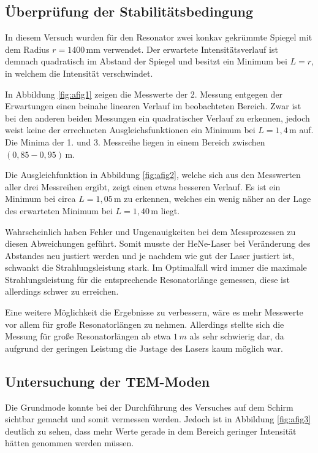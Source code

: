 \subsection*{Überprüfung der Stabilitätsbedingung}
In diesem Versuch wurden für den Resonator zwei konkav gekrümmte Spiegel mit dem Radius $r=1400\,\si{\mm}$ verwendet.
Der erwartete Intensitätsverlauf ist demnach quadratisch im Abstand der Spiegel und besitzt ein Minimum bei $L = r$, in welchem die Intensität verschwindet.

In Abbildung \ref{fig:afig1} zeigen die Messwerte der 2. Messung entgegen der Erwartungen einen beinahe linearen Verlauf im beobachteten Bereich. 
Zwar ist bei den anderen beiden Messungen ein quadratischer Verlauf zu erkennen, jedoch weist keine der errechneten Ausgleichsfunktionen ein Minimum bei $L = 1,4\,\si{\m}$ auf.
Die Minima der 1. und 3. Messreihe liegen in einem Bereich zwischen $(0,85-0,95)\,\si{\m}$.

Die Ausgleichfunktion in Abbildung \ref{fig:afig2}, welche sich aus den Messwerten aller drei Messreihen ergibt, zeigt einen etwas besseren Verlauf.
Es ist ein Minimum bei circa $L=1,05\,\si{\m}$ zu erkennen, welches ein wenig näher an der Lage des erwarteten Minimum bei $L=1,40\,\si{\m}$ liegt.

Wahrscheinlich haben Fehler und Ungenauigkeiten bei dem Messprozessen zu diesen Abweichungen geführt.
Somit musste der HeNe-Laser bei Veränderung des Abstandes neu justiert werden und je nachdem wie gut der Laser justiert ist, schwankt die Strahlungsleistung stark.
Im Optimalfall wird immer die maximale Strahlungsleistung für die entsprechende Resonatorlänge gemessen, diese ist allerdings schwer zu erreichen.

Eine weitere Möglichkeit die Ergebnisse zu verbessern, wäre es mehr Messwerte vor allem für große Resonatorlängen zu nehmen.
Allerdings stellte sich die Messung für große Resonatorlängen ab etwa $1\,\si{m}$ als sehr schwierig dar, da aufgrund der geringen Leistung die Justage des Lasers kaum möglich war.


\subsection*{Untersuchung der TEM-Moden}
Die Grundmode konnte bei der Durchführung des Versuches auf dem Schirm sichtbar gemacht und somit vermessen werden. 
Jedoch ist in Abbildung \ref{fig:afig3} deutlich zu sehen, dass mehr Werte gerade in dem Bereich geringer Intensität hätten genommen werden müssen.

